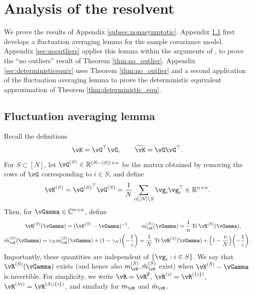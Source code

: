 

\section{Analysis of the resolvent}\label{appendix:resolvent}

We prove the results of Appendix \ref{subsec:nonasymptotic}. Appendix
\ref{sec:fluctuation} first develops a fluctuation averaging lemma for
the sample covariance model. Appendix \ref{sec:nooutliers} applies this lemma
within the arguments of \cite{bai1998no}, to prove the ``no outliers'' result
of Theorem \ref{thm:no_outlier}. Appendix \ref{sec:deterministicequiv} uses
Theorem \ref{thm:no_outlier} and a second application of the fluctuation
averaging lemma to prove the deterministic equivalent
approximation of Theorem \ref{thm:deterministic_equ}.

\subsection{Fluctuation averaging lemma}\label{sec:fluctuation}

Recall the definitions
\[\vK=\vG^\top \vG, \qquad \widetilde \vK=\vG\vG^\top.\]
For $S \subset [N]$, let $\vG^{(S)} \in \R^{(N-|S|) \times n}$ be the matrix
obtained by removing the rows of $\vG$ corresponding to $i \in S$, and define
\[\vK^{(S)}={\vG^{(S)}}^\top \vG^{(S)}
=\frac{1}{N}\sum_{i \in [N] \setminus S} \vg_i\vg_i^\top \in \R^{n \times n}.\]
Then, for $\vGamma \in \C^{n \times n}$, define
\begin{equation}\label{eq:leaveoneout}
\begin{gathered}
\qquad \vR^{(S)}(\vGamma)=(\vK^{(S)}-\vGamma)^{-1},
\qquad m_{\vK}^{(S)}(\vGamma)=\frac{1}{n}\Tr \vR^{(S)}(\vGamma),\\
\tilde m_{\vK}^{(S)}(\vGamma)=\gamma_N m_{\vK}^{(S)}(\vGamma)
+(1-\gamma_N)\left({-}\frac{1}{z}\right)
=\frac{1}{N}\,\Tr\vR^{(S)}(\vGamma)+\left(1-\frac{n}{N}\right)\left({-}\frac{1}{z}\right).
\end{gathered}
\end{equation}
Importantly, these quantities are independent of $\{\vg_i:i \in S\}$.
We say that $\vR^{(S)}(\vGamma)$ exists (and hence also $m_{\vK}^{(S)},\tilde m_{\vK}^{(S)}$ exist) when $\vK^{(S)}-\vGamma$ is invertible.
For simplicity, we write $\vR=\vR^\emptyset$, $\vR^{(i)}=\vR^{(\{i\})}$,
$\vR^{(Si)}=\vR^{(S \cup \{i\})}$, and similarly for $m_{\vK}$ and $\tilde
m_{\vK}$.

